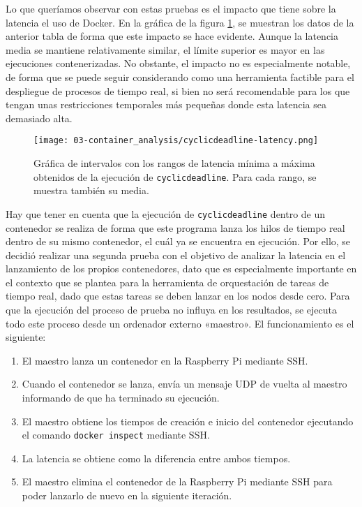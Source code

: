 Lo que queríamos observar con estas pruebas es el impacto que tiene sobre la
latencia el uso de Docker. En la gráfica de la figura
\ref{fig:03-cyclicdeadline_latency}, se muestran los datos de la anterior tabla
de forma que este impacto se hace evidente. Aunque la latencia media se mantiene
relativamente similar, el límite superior es mayor en las ejecuciones
contenerizadas. No obstante, el impacto no es especialmente notable, de forma
que se puede seguir considerando como una herramienta factible para el
despliegue de procesos de tiempo real, si bien no será recomendable para los que
tengan unas restricciones temporales más pequeñas donde esta latencia sea
demasiado alta.

\begin{figure}
    \centering
    \texttt{[image: 03-container\_analysis/cyclicdeadline-latency.png]}
    \caption{Gráfica de intervalos con los rangos de latencia mínima a máxima
        obtenidos de la ejecución de \texttt{cyclicdeadline}. Para cada rango, se
        muestra también su media.}
    \label{fig:03-cyclicdeadline_latency}
\end{figure}

Hay que tener en cuenta que la ejecución de \texttt{cyclicdeadline} dentro de un
contenedor se realiza de forma que este programa lanza los hilos de tiempo real
dentro de su mismo contenedor, el cuál ya se encuentra en ejecución. Por ello,
se decidió realizar una segunda prueba con el objetivo de analizar la latencia
en el lanzamiento de los propios contenedores, dato que es especialmente
importante en el contexto que se plantea para la herramienta de orquestación de
tareas de tiempo real, dado que estas tareas se deben lanzar en los nodos desde
cero. Para que la ejecución del proceso de prueba no influya en los resultados,
se ejecuta todo este proceso desde un ordenador externo «maestro». El
funcionamiento es el siguiente:

\begin{enumerate}
    \item El maestro lanza un contenedor en la Raspberry Pi mediante SSH.
    \item Cuando el contenedor se lanza, envía un mensaje UDP de vuelta al
          maestro informando de que ha terminado su ejecución.
    \item El maestro obtiene los tiempos de creación e inicio del contenedor
          ejecutando el comando \texttt{docker inspect} mediante SSH.
    \item La latencia se obtiene como la diferencia entre ambos tiempos.
    \item El maestro elimina el contenedor de la Raspberry Pi mediante SSH para
          poder lanzarlo de nuevo en la siguiente iteración.
\end{enumerate}

